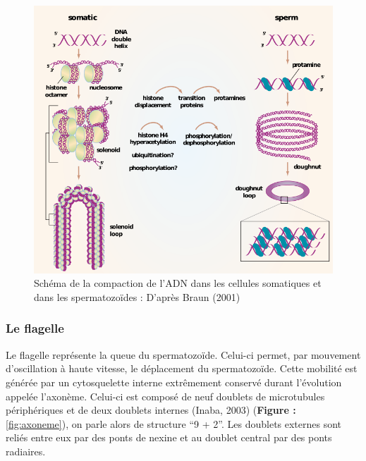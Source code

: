 \documentclass[12pt,twoside]{reedthesis}
\theoremstyle{definition}
\theoremstyle{definition}
\theoremstyle{remark}
\begin{document}
  \begin{figure}
  
  {\centering \includegraphics[scale=.55]{figure/noyau} 
  
  }
  
  \caption[Schéma de la compaction de l’ADN dans les cellules somatiques et dans les spermatozoïdes]{Schéma de la compaction de l’ADN dans les cellules somatiques et dans les spermatozoïdes : D'après Braun (2001)}\label{fig:noyau}
  \end{figure}
  
  \subsubsection{Le flagelle}\label{le-flagelle}
  
  Le flagelle représente la queue du spermatozoïde. Celui-ci permet, par
  mouvement d'oscillation à haute vitesse, le déplacement du
  spermatozoïde. Cette mobilité est générée par un cytosquelette interne
  extrêmement conservé durant l'évolution appelée l'axonème. Celui-ci est
  composé de neuf doublets de microtubules périphériques et de deux
  doublets internes (Inaba, 2003) (\textbf{Figure : }\ref{fig:axoneme}),
  on parle alors de structure ``9 + 2''. Les doublets externes sont reliés
  entre eux par des ponts de nexine et au doublet central par des ponts
  radiaires.
  
\end{document}
